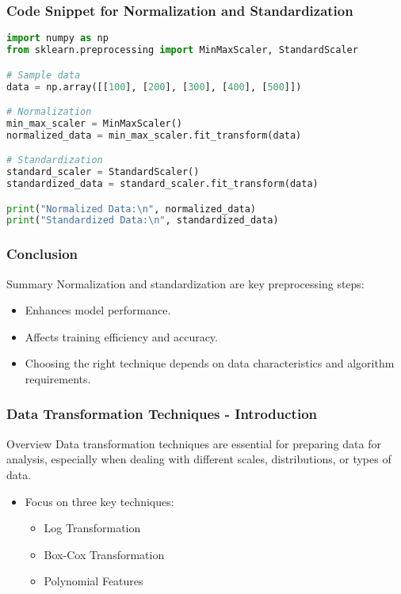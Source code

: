 \documentclass[aspectratio=169]{beamer}
\begin{document}
\begin{frame}[fragile]
    \frametitle{Code Snippet for Normalization and Standardization}
    \begin{lstlisting}[language=Python]
import numpy as np
from sklearn.preprocessing import MinMaxScaler, StandardScaler

# Sample data
data = np.array([[100], [200], [300], [400], [500]])

# Normalization
min_max_scaler = MinMaxScaler()
normalized_data = min_max_scaler.fit_transform(data)

# Standardization
standard_scaler = StandardScaler()
standardized_data = standard_scaler.fit_transform(data)

print("Normalized Data:\n", normalized_data)
print("Standardized Data:\n", standardized_data)
    \end{lstlisting}
\end{frame}

\begin{frame}[fragile]
    \frametitle{Conclusion}
    \begin{block}{Summary}
        Normalization and standardization are key preprocessing steps:
        \begin{itemize}
            \item Enhances model performance.
            \item Affects training efficiency and accuracy.
            \item Choosing the right technique depends on data characteristics and algorithm requirements.
        \end{itemize}
    \end{block}
\end{frame}

\begin{frame}[fragile]
    \frametitle{Data Transformation Techniques - Introduction}
    \begin{block}{Overview}
        Data transformation techniques are essential for preparing data for analysis, especially when dealing with different scales, distributions, or types of data. 
    \end{block}
    
    \begin{itemize}
        \item Focus on three key techniques: 
        \begin{itemize}
            \item Log Transformation
            \item Box-Cox Transformation
            \item Polynomial Features
        \end{itemize}
    \end{itemize}
\end{frame}
\end{document}
